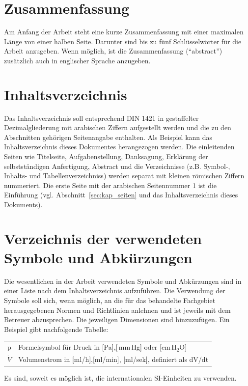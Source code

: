 \section{Zusammenfassung}
Am Anfang der Arbeit steht eine kurze Zusammenfassung mit einer maximalen Länge von einer
halben Seite. Darunter sind bis zu fünf Schlüsselwörter für die Arbeit anzugeben. Wenn
möglich, ist die Zusammenfassung ("`abstract"') zusätzlich auch in englischer Sprache anzugeben.

\section{Inhaltsverzeichnis}
Das Inhaltsverzeichnis soll entsprechend DIN 1421 in gestaffelter Dezimalgliederung mit
arabischen Ziffern aufgestellt werden und die zu den Abschnitten gehörigen Seitenangabe
enthalten. Als Beispiel kann das Inhaltsverzeichnis dieses Dokumentes herangezogen werden.
Die einleitenden Seiten wie Titelseite, Aufgabenstellung, Danksagung, Erklärung der selbstständigen Anfertigung, Abstract und die Verzeichnisse (z.B. Symbol-, Inhalts- und Tabellenverzeichniss) werden separat mit kleinen römischen Ziffern nummeriert. Die erste Seite mit der arabischen Seitennummer 1 ist die Einführung (vgl. Abschnitt~\ref{sec:kap_seiten} und das Inhaltsverzeichnis dieses Dokuments).


\section{Verzeichnis der verwendeten Symbole und Abkürzungen}

Die wesentlichen in der Arbeit verwendeten Symbole und Abkürzungen sind in einer Liste nach dem
Inhaltsverzeichnis aufzuführen. Die Verwendung der Symbole soll sich, wenn möglich, an die für das
behandelte Fachgebiet herausgegebenen Normen und Richtlinien anlehnen und ist jeweils mit dem
Betreuer abzusprechen. Die jeweiligen Dimensionen sind hinzuzufügen. Ein Beispiel gibt nachfolgende
Tabelle:

\begin{table}[!ht]
	\centering
	\vspace{5mm}
	\begin{tabular}{|ll|}
		\hline
		p & Formelsymbol für Druck in [Pa],[$\,$mm$\,$Hg] oder [cm$\,$H$_2$O]\\
		$\dot V$ & Volumenstrom in [ml/h],[ml/min], [ml/sek], definiert als dV/dt\\
		\hline
	\end{tabular}
	
	\label{tab:AngabeVonSymbolen}
\end{table}
Es sind, soweit es möglich ist, die internationalen SI-Einheiten zu verwenden.

